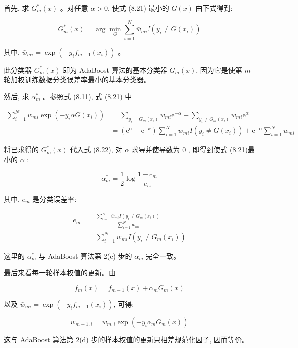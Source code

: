 \documentclass[10pt]{article}
\begin{document}
首先, 求 $G_{m}^{*}(x)$ 。对任意 $\alpha>0$, 使式 (8.21) 最小的 $G(x)$ 由下式得到:

$$
G_{m}^{*}(x)=\arg \min _{G} \sum_{i=1}^{N} \bar{w}_{m i} I\left(y_{i} \neq G\left(x_{i}\right)\right)
$$

其中, $\bar{w}_{m i}=\exp \left(-y_{i} f_{m-1}\left(x_{i}\right)\right)$ 。

此分类器 $G_{m}^{*}(x)$ 即为 AdaBoost 算法的基本分类器 $G_{m}(x)$, 因为它是使第 $m$ 轮加权训练数据分类误差率最小的基本分类器。

然后, 求 $\alpha_{m}^{*}$ 。参照式 (8.11), 式 (8.21) 中


\begin{align*}
\sum_{i=1}^{N} \bar{w}_{m i} \exp \left(-y_{i} \alpha G\left(x_{i}\right)\right) & =\sum_{y_{i}=G_{m}\left(x_{i}\right)} \bar{w}_{m i} \mathrm{e}^{-\alpha}+\sum_{y_{i} \neq G_{m}\left(x_{i}\right)} \bar{w}_{m i} \mathrm{e}^{\alpha} \\
& =\left(\mathrm{e}^{\alpha}-\mathrm{e}^{-\alpha}\right) \sum_{i=1}^{N} \bar{w}_{m i} I\left(y_{i} \neq G\left(x_{i}\right)\right)+\mathrm{e}^{-\alpha} \sum_{i=1}^{N} \bar{w}_{m i} \tag{8.22}
\end{align*}


将已求得的 $G_{m}^{*}(x)$ 代入式 (8.22), 对 $\alpha$ 求导并使导数为 0 , 即得到使式 (8.21)最小的 $\alpha$ :

$$
\alpha_{m}^{*}=\frac{1}{2} \log \frac{1-e_{m}}{e_{m}}
$$

其中, $e_{m}$ 是分类误差率:


\begin{align*}
e_{m} & =\frac{\sum_{i=1}^{N} \bar{w}_{m i} I\left(y_{i} \neq G_{m}\left(x_{i}\right)\right)}{\sum_{i=1}^{N} \bar{w}_{m i}} \\
& =\sum_{i=1}^{N} w_{m i} I\left(y_{i} \neq G_{m}\left(x_{i}\right)\right) \tag{8.23}
\end{align*}


这里的 $\alpha_{m}^{*}$ 与 AdaBoost 算法第 2(c) 步的 $\alpha_{m}$ 完全一致。

最后来看每一轮样本权值的更新。由

$$
f_{m}(x)=f_{m-1}(x)+\alpha_{m} G_{m}(x)
$$

以及 $\bar{w}_{m i}=\exp \left(-y_{i} f_{m-1}\left(x_{i}\right)\right)$, 可得:

$$
\bar{w}_{m+1, i}=\bar{w}_{m, i} \exp \left(-y_{i} \alpha_{m} G_{m}(x)\right)
$$

这与 AdaBoost 算法第 2(d) 步的样本权值的更新只相差规范化因子, 因而等价。
\end{document}
